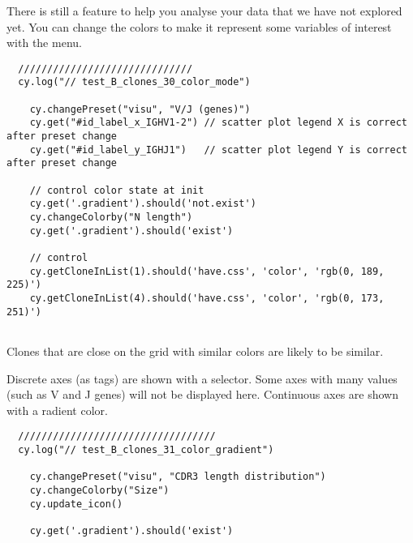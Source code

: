 There is still a feature to help you analyse your data that we have not
explored yet.
You can change the colors to make it represent some variables of interest
with the  menu.
\begin{verbatim}
  //////////////////////////////
  cy.log("// test_B_clones_30_color_mode")

    cy.changePreset("visu", "V/J (genes)")
    cy.get("#id_label_x_IGHV1-2") // scatter plot legend X is correct after preset change
    cy.get("#id_label_y_IGHJ1")   // scatter plot legend Y is correct after preset change

    // control color state at init
    cy.get('.gradient').should('not.exist')
    cy.changeColorby("N length")
    cy.get('.gradient').should('exist')

    // control
    cy.getCloneInList(1).should('have.css', 'color', 'rgb(0, 189, 225)')
    cy.getCloneInList(4).should('have.css', 'color', 'rgb(0, 173, 251)')


\end{verbatim}
  
Clones that are close on the grid with similar colors are likely to
be similar.

Discrete axes (as tags) are shown with a selector.
Some axes with many values (such as V and J genes) will not be displayed here.
Continuous axes are shown with a radient color.
\begin{verbatim}
  //////////////////////////////////
  cy.log("// test_B_clones_31_color_gradient")

    cy.changePreset("visu", "CDR3 length distribution")
    cy.changeColorby("Size")
    cy.update_icon()

    cy.get('.gradient').should('exist')


\end{verbatim}

